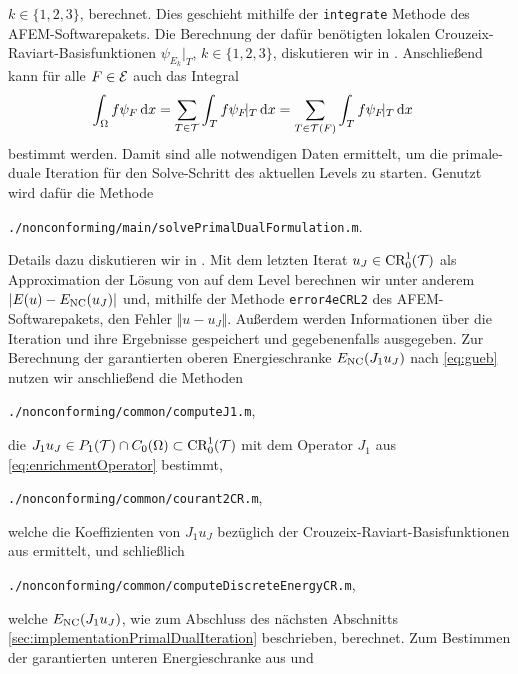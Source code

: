$k\in\{1,2,3\}$, berechnet. 
Dies geschieht mithilfe der \texttt{integrate} Methode \cite[Abschnitt
1.8.2]{CGKNRR10} des AFEM-Softwarepakets.
Die Berechnung der dafür benötigten lokalen Crouzeix-Raviart-Basisfunktionen
$\psi_{E_k}\!|_T$, $k\in\{1,2,3\}$, diskutieren wir in
.
Anschließend kann für alle $F\in\mathcal{E}$ auch das Integral 
\begin{align*}
  \int_\Omega f\psi_F\,\mathrm{d}x
  &=
  \sum_{T\in\mathcal{T}}\int_T f\psi_F\!|_T\,\mathrm{d}x
  =
  \sum_{T\in\mathcal{T}(F)}\int_T f\psi_F\!|_T\,\mathrm{d}x
\end{align*}
bestimmt werden.
Damit sind alle notwendigen Daten ermittelt, um die primale-duale Iteration für
den Solve-Schritt des aktuellen Levels zu starten. 
Genutzt wird dafür die Methode
\begin{center}
  \texttt{./nonconforming/main/solvePrimalDualFormulation.m}.
\end{center}
Details dazu diskutieren wir in .
Mit dem letzten Iterat $u_J\in\textup{CR}^1_0(\mathcal{T})$ als Approximation der Lösung von
 auf dem Level berechnen wir unter anderem
$|E(u)-E_\textup{NC}(u_J)|$ und, mithilfe der Methode \texttt{error4eCRL2}
\cite[Abschnitt 1.8.3]{CGKNRR10} des AFEM-Soft\-ware\-pakets, den Fehler $\Vert
u - u_J\Vert$.
Außerdem werden Informationen über die Iteration und ihre Ergebnisse
gespeichert und gegebenenfalls ausgegeben. 
Zur Berechnung der garantierten oberen Energieschranke $E_\textup{NC}(J_1 u_J)$ nach
\eqref{eq:gueb} nutzen wir anschließend die Methoden
\begin{center}
    \texttt{./nonconforming/common/computeJ1.m},
\end{center}
die $J_1 u_J\in P_1(\mathcal{T})\cap C_0(\Omega)\subset \textup{CR}^1_0(\mathcal{T})$ mit dem
Operator $J_1$ aus \eqref{eq:enrichmentOperator} bestimmt,
\begin{center}
    \texttt{./nonconforming/common/courant2CR.m},
\end{center}
welche die Koeffizienten von $J_1 u_J$ bezüglich der
Crouzeix-Raviart-Basisfunktionen aus  
ermittelt, und schließlich
\begin{center}
    \texttt{./nonconforming/common/computeDiscreteEnergyCR.m},
\end{center}
welche $E_\textup{NC}(J_1 u_J)$, wie zum Abschluss des nächsten Abschnitts
\ref{sec:implementationPrimalDualIteration} beschrieben, berechnet.
Zum Bestimmen der garantierten unteren Energieschranke aus  und
